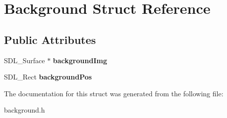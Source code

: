 \hypertarget{structBackground}{}\section{Background Struct Reference}
\label{structBackground}
\subsection*{Public Attributes}
\begin{DoxyCompactItemize}
\item 
\mbox{\label{structBackground_ade7f4649cb1e02ab75167ce898db884c}} 
S\+D\+L\+\_\+\+Surface $\ast$ {\bfseries background\+Img}
\item 
\mbox{\label{structBackground_a81fdaea521be13c6634186f72b105e33}} 
S\+D\+L\+\_\+\+Rect {\bfseries background\+Pos}
\end{DoxyCompactItemize}


The documentation for this struct was generated from the following file\+:\begin{DoxyCompactItemize}
\item 
background.\+h\end{DoxyCompactItemize}
